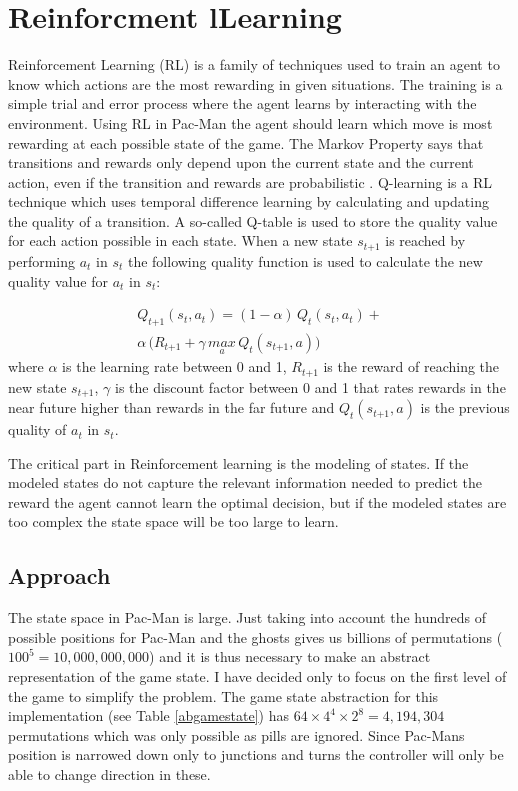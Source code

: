 \documentclass[conference]{IEEEtran}
\begin{document}
\section{Reinforcment lLearning}
Reinforcement Learning (RL) is a family of techniques used to train an agent to know which actions are the most rewarding in given situations. The training is a simple trial and error process where the agent learns by interacting with the environment. Using RL in Pac-Man the agent should learn which move is most rewarding at each possible state of the game. The Markov Property says that transitions and rewards only depend upon the current state and the current action, even if the transition and rewards are probabilistic \cite{RLthesis}. 
Q-learning is a RL technique which uses temporal difference learning by calculating and updating the quality of a transition. A so-called Q-table is used to store the quality value for each action possible in each state. When a new state $s_{t\mathrm{+1}}$ is reached by performing $a_{t}$ in $s_{t}$ the following quality function is used to calculate the new quality value for $a_{t}$ in $s_{t}$:

\begin{eqnarray}
Q_{t\mathrm{+1}}(s_{t}, a_{t}) = (1-\alpha) \, Q_{t}(s_{t}, a_{t}) + \nonumber \\  
\alpha \, \Big(R_{t\mathrm{+1}} + \gamma \, \underset{a} {max} \, Q_{t} (s_{t\mathrm{+1}},a)\Big) \nonumber 
\end{eqnarray}
where $\alpha$ is the learning rate between 0 and 1, $R_{t\mathrm{+1}}$ is the reward of reaching the new state $s_{t\mathrm{+1}}$, $\gamma$ is the discount factor between 0 and 1 that rates rewards in the near future higher than rewards in the far future and $Q_{t} (s_{t\mathrm{+1}},a)$ is the previous quality of $a_{t}$ in $s_{t}$. 

The critical part in Reinforcement learning is the modeling of states. If the modeled states do not capture the relevant information needed to predict the reward the agent cannot learn the optimal decision, but if the modeled states are too complex the state space will be too large to learn.

\subsection{Approach}
The state space in Pac-Man is large. Just taking into account the hundreds of possible positions for Pac-Man and the ghosts gives us billions of permutations ($100^{5}=10,000,000,000$) and it is thus necessary to make an abstract representation of the game state. I have decided only to focus on the first level of the game to simplify the problem. The game state abstraction for this implementation (see Table \ref{abgamestate}) has $64 \times 4^{4} \times 2^{8} = 4,194,304$ permutations which was only possible as pills are ignored. Since Pac-Mans position is narrowed down only to junctions and turns the controller will only be able to change direction in these.
\end{document}
